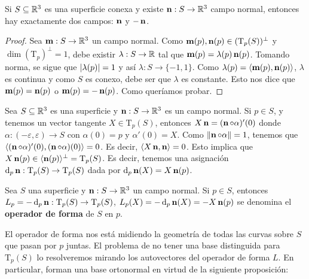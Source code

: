 \begin{prop}
Si $S\subseteq\mathbb{R}^3$ es una superficie conexa y existe $\operatorname{\mathbf{n}}:S\to\mathbb{R}^3$ campo normal, entonces hay exactamente dos campos: $\operatorname{\mathbf{n}}$ y $-\operatorname{\mathbf{n}}$.
\begin{proof}
Sea $\mathbf{m}:S\to\mathbb{R}^3$ un campo normal. Como $\mathbf{m}(p),\operatorname{\mathbf{n}}(p)\in(\mathrm{T}_p(S))^\perp$ y $\dim (\mathrm{T}_p)^\perp = 1$, debe existir $\lambda:S\to\mathbb{R}$ tal que $\mathbf{m}(p)=\lambda(p)\operatorname{\mathbf{n}}(p)$. Tomando norma, se sigue que $\left\lvert \lambda(p) \right\rvert=1$ y así $\lambda:S\to \{-1,1\}$. Como $\lambda(p)=\left\langle \mathbf{m}(p),\operatorname{\mathbf{n}}(p) \right\rangle$, $\lambda$ es continua y como $S$ es conexo, debe ser que $\lambda$ es constante. Esto nos dice que $\mathbf{m}(p)=\operatorname{\mathbf{n}}(p)$ o $\mathbf{m}(p)=-\operatorname{\mathbf{n}}(p)$. Como queríamos probar.
\end{proof}
\end{prop}

Sea $S\subseteq\mathbb{R}^3$ es una superficie y $\operatorname{\mathbf{n}}:S\to\mathbb{R}^3$ es un campo normal. Si $p\in S$, y tenemos un vector tangente $X\in\mathrm{T}_p(S)$, entonces $X\operatorname{\mathbf{n}} = (\operatorname{\mathbf{n}}\circ\alpha)'(0)$ donde $\alpha:(-\varepsilon,\varepsilon)\to S$ con $\alpha(0)=p$ y $\alpha'(0)=X$. Como $\left\| \operatorname{\mathbf{n}}\circ\alpha \right\|=1$, tenemos que $\left\langle (\operatorname{\mathbf{n}}\circ\alpha)'(0),(\operatorname{\mathbf{n}}\circ\alpha)(0) \right\rangle=0$. Es decir, $\left\langle X\operatorname{\mathbf{n}},\operatorname{\mathbf{n}} \right\rangle=0$. Esto implica que $X\operatorname{\mathbf{n}}(p)\in \langle\operatorname{\mathbf{n}}(p)\rangle^\perp = \mathrm{T}_p(S)$. Es decir, tenemos una asignación $\mathop{}\!\mathrm{d}_p\operatorname{\mathbf{n}}:\mathrm{T}_p(S)\to\mathrm{T}_p(S)$ dada por $\mathop{}\!\mathrm{d}_p\operatorname{\mathbf{n}}(X)=X\operatorname{\mathbf{n}}(p)$.

\begin{defn}
Sea $S$ una superficie y $\operatorname{\mathbf{n}}:S\to\mathbb{R}^3$ un campo normal. Si $p\in S$, entonces $L_p=-\mathop{}\!\mathrm{d}_p\operatorname{\mathbf{n}}:\mathrm{T}_p(S)\to\mathrm{T}_p(S)$, $L_p(X)=-\mathop{}\!\mathrm{d}_p\operatorname{\mathbf{n}}(X) = -X\operatorname{\mathbf{n}}(p)$ se denomina el \textbf{operador de forma} de $S$ en $p$.
\end{defn}

El operador de forma nos está midiendo la geometría de todas las curvas sobre $S$ que pasan por $p$ juntas. El problema de no tener una base distinguida para $\mathrm{T}_p(S)$ lo resolveremos mirando los autovectores del operador de forma $L$. En particular, forman una base ortonormal en virtud de la siguiente proposición:

